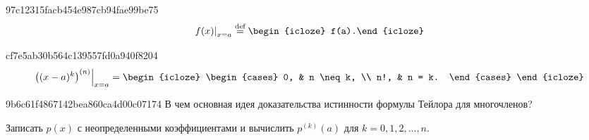 
\begin{note}{97c12315facb454e987cb94fae99be75}
\[
    \left. f(x) \right|_{x = a} \overset{\text{def}}= \begin{icloze}{1}f(a).\end{icloze}
\]
\end{note}

\begin{note}{cf7e5ab30b564c139557fd0a940f8204}
    \[
        \left. \left((x - a)^{k} \right)^{(n)}  \right|_{x = a} =
        \begin{icloze}{1}
            \begin{cases}
                0, & n \neq k, \\
                n!, & n = k.
            \end{cases}
        \end{icloze}
    \]
\end{note}

\begin{note}{9b6c61f4867142bea860ca4d00c07174}
    В чем основная идея доказательства истинности формулы Тейлора для многочленов?

    \begin{cloze}{1}
        Записать \( p(x) \) с неопределенными коэффициентами и вычислить \( p^{(k)} (a) \) для \( k = 0, 1, 2, \ldots, n \).
    \end{cloze}
\end{note}


